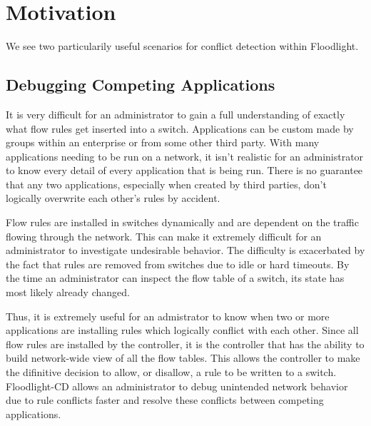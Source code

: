 \section{Motivation}
\label{sec:motivation}

We see two particularily useful scenarios for conflict detection within Floodlight.

\subsection{Debugging Competing Applications}
It is very difficult for an administrator to gain a full understanding of exactly what flow rules get inserted into a switch. 
Applications can be custom made by groups within an enterprise or from some other third party.
With many applications needing to be run on a network, it isn't realistic for an administrator to know every detail of every application that is being run.
There is no guarantee that any two applications, especially when created by third parties, don't logically overwrite each other's rules by accident.

Flow rules are installed in switches dynamically and are dependent on the traffic flowing through the network.
This can make it extremely difficult for an administrator to investigate undesirable behavior.
The difficulty is exacerbated by the fact that rules are removed from switches due to idle or hard timeouts.
By the time an administrator can inspect the flow table of a switch, its state has most likely already changed.

Thus, it is extremely useful for an admistrator to know when two or more applications are installing rules which logically conflict with each other.
Since all flow rules are installed by the controller, it is the controller that has the ability to build network-wide view of all the flow tables.
This allows the controller to make the difinitive decision to allow, or disallow, a rule to be written to a switch.
Floodlight-CD allows an administrator to debug unintended network behavior due to rule conflicts faster and resolve these conflicts between competing applications.

